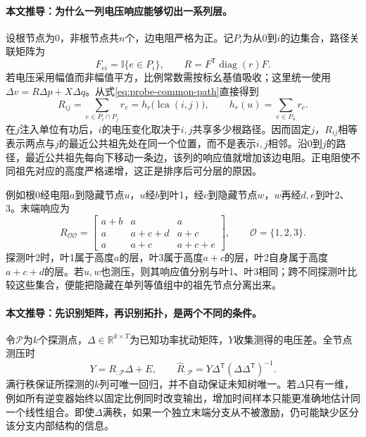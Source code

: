 \documentclass[UTF8,11pt,fontset=fandol]{ctexart}
\theoremstyle{remark}
\numberwithin{equation}{section}
\begin{document}
\paragraph{本文推导：为什么一列电压响应能够切出一系列层。}
设根节点为0，非根节点共$n$个，边电阻严格为正。记$P_i$为从0到$i$的边集合，路径关联矩阵为
\begin{equation}
 F_{ei}=\mathbb{I}\{e\in P_i\},\qquad
 R=F^{\mathsf T}\operatorname{diag}(r)F.
 \label{eq:probe-common-path}
\end{equation}
若电压采用幅值而非幅值平方，比例常数需按标幺基值吸收；这里统一使用$\Delta v=R\Delta p+X\Delta q$。从式\eqref{eq:probe-common-path}直接得到
\begin{equation}
 R_{ij}=\sum_{e\in P_i\cap P_j}r_e
       =h_r\bigl(\operatorname{lca}(i,j)\bigr),
 \qquad h_r(u)=\sum_{e\in P_u}r_e.
 \label{eq:probe-lca}
\end{equation}
在$j$注入单位有功后，$i$的电压变化取决于$i,j$共享多少根路径。因而固定$j$，$R_{ij}$相等表示两点与$j$的最近公共祖先处在同一个位置，而不是表示$i,j$相邻。沿$0$到$j$的路径，最近公共祖先每向下移动一条边，该列的响应值就增加该边电阻。正电阻使不同祖先对应的高度严格递增，这正是排序后可分层的原因。

例如根0经电阻$a$到隐藏节点$u$，$u$经$b$到叶1，经$c$到隐藏节点$w$，$w$再经$d,e$到叶2、3。末端响应为
\begin{equation}
 R_{\mathcal O\mathcal O}=
 \begin{bmatrix}
 a+b&a&a\\
 a&a+c+d&a+c\\
 a&a+c&a+c+e
 \end{bmatrix},\qquad \mathcal O=\{1,2,3\}.
 \label{eq:probe-three-leaf}
\end{equation}
探测叶2时，叶1属于高度$a$的层，叶3属于高度$a+c$的层，叶2自身属于高度$a+c+d$的层。若$u,w$也测压，则其响应值分别与叶1、叶3相同；跨不同探测叶比较这些集合，便能把隐藏在单列等值组中的祖先节点分离出来。

\paragraph{本文推导：先识别矩阵，再识别拓扑，是两个不同的条件。}
令$\mathcal P$为$k$个探测点，$\Delta\in\mathbb R^{k\times T}$为已知功率扰动矩阵，$Y$收集测得的电压差。全节点测压时
\begin{equation}
 Y=R_{:\mathcal P}\Delta+E,
 \qquad
 \widehat R_{:\mathcal P}
 =Y\Delta^{\mathsf T}(\Delta\Delta^{\mathsf T})^{-1}.
 \label{eq:probe-ls}
\end{equation}
满行秩保证所探测的$k$列可唯一回归，并不自动保证未知树唯一。若$\Delta$只有一维，例如所有逆变器始终以固定比例同时改变输出，增加时间样本只能更准确地估计同一个线性组合。即使$\Delta$满秩，如果一个独立末端分支从不被激励，仍可能缺少区分该分支内部结构的信息。
\end{document}
